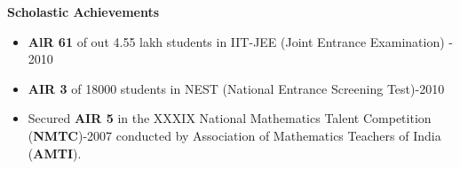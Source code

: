\documentclass[a4paper,10pt]{article}
\newcommand{\isep}{-2 pt}
\newcommand{\resheading}[1]{{\small \colorbox{mygrey}{\begin{minipage}{0.975\textwidth}{\textbf{#1 \vphantom{p\^{E}}}}\end{minipage}}}}
\begin{document}
\begin{itemize}
\begin{itemize}
	\end{itemize} 
\begin{comment}
\item \textbf{Term paper on Working of a Cordless Telephone} \emph{(Guided by Prof. Vasi J. , EE112 - Spring 2011)\\[-0.7cm]}
	\begin{itemize} \itemsep \isep
	  \item Opened and Analyzed a Cordless phone in a team of 3 members and written a 12-page Term paper with details of working of the phone.
	  \end{itemize}
\end{comment}
\end{itemize}

\resheading{\textbf{\large Scholastic Achievements}}
\begin{itemize}
  \item \textbf{AlR 61} of out 4.55 lakh students in IIT-JEE (Joint Entrance Examination) - 2010 \\[-0.7cm]
  
\item \textbf{AIR 3} of 18000 students in NEST (National Entrance Screening Test)-2010  \\[-0.7cm]%

  
 \item Secured \textbf{AIR 5} in the  XXXIX National Mathematics Talent Competition (\textbf{NMTC})-2007 conducted by Association of Mathematics Teachers of India (\textbf{AMTI}).\\[-0.7cm]
  \\
\end{itemize}
\end{document}
